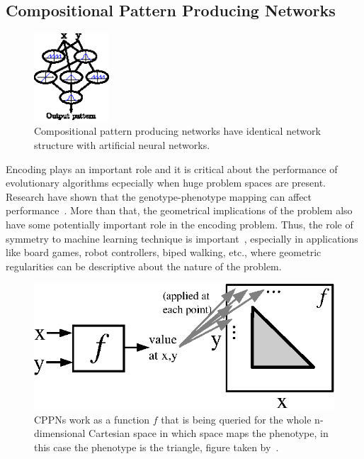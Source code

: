 \subsection{Compositional Pattern Producing Networks}

\begin{figure}
\centering
\includegraphics[width=0.25\textwidth]{../Figures/Misc/cppnNetwork.eps}
\caption{Compositional pattern producing networks have identical network structure with artificial neural networks.}
\label{fig:cppnNetwork}
\end{figure}

Encoding plays an important role and it is critical about the performance of evolutionary algorithms ecpecially when huge problem spaces are present. Research have shown that the genotype-phenotype mapping can affect performance~\cite{komosinski2001comparison}. More than that, the geometrical implications of the problem also have some potentially important role in the encoding problem. Thus, the role of symmetry to machine learning technique is important~\cite{gauci:aaai08}, especially in applications like board games, robot controllers, biped walking, etc., where geometric regularities can be descriptive about the nature of the problem.

\begin{figure}
\centering
\includegraphics{../Figures/Misc/cppnResolution.eps}
\caption{CPPNs work as a function $f$ that is being queried for the whole n-dimensional Cartesian space in which space maps the phenotype, in this case the phenotype is the triangle, figure taken by~\cite{stanley2007compositional}.}
\label{fig:cppnResolution}
\end{figure}

